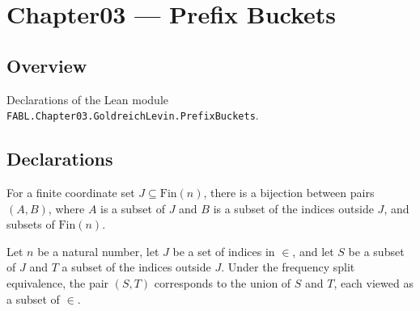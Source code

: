 \chapter{Chapter03 — Prefix Buckets}
\section{Overview}

Declarations of the Lean module \texttt{FABL.Chapter03.GoldreichLevin.PrefixBuckets}.

\section{Declarations}

\begin{definition}
\label{FABL.frequencySplitEquiv}
\leanok
{}
For a finite coordinate set $J\subseteq\mathrm{Fin}(n)$, there is a bijection between
pairs $(A,B)$, where $A$ is a subset of $J$ and $B$ is a subset of the indices outside
$J$, and subsets of $\mathrm{Fin}(n)$.
\end{definition}

\begin{theorem}
\label{FABL.frequencySplitEquiv_apply}
\leanok
{}
Let $n$ be a natural number, let $J$ be a set of indices in $\in$, and let $S$ be a
subset of $J$ and $T$ a subset of the indices outside $J$. Under the frequency split
equivalence, the pair $(S,T)$ corresponds to the union of $S$ and $T$, each viewed as a
subset of $\in$.
\end{theorem}

